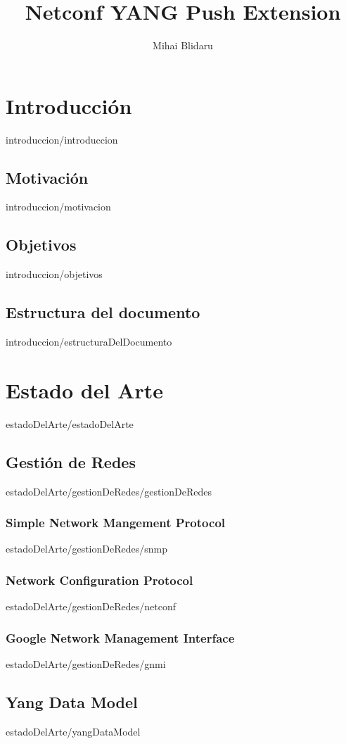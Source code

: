 \documentclass[epsbased, copyright, final, overleaf, printable, extendedindex, firstnumbered, tfg]{tfgtfmthesisuam}
\title{Netconf YANG Push Extension}
\author{Mihai Blidaru}
\begin{document}


\chapter{Introducción\label{CAP:INTRODUCION}}{introduccion/introduccion}
  \section{Motivación\label{SEC:MOTIVACION}}{introduccion/motivacion}
  \section{Objetivos\label{SEC:OBJETIVOS}}{introduccion/objetivos}
  \section{Estructura del documento\label{SEC:ESTRUCTURA_DEL_DOCUMENTO}}{introduccion/estructuraDelDocumento}

\chapter{Estado del Arte\label{CAP:ESTADO_DEL_ARTE}}{estadoDelArte/estadoDelArte}
  \section{Gestión de Redes\label{SEC:GESTION_DE_REDES}}{estadoDelArte/gestionDeRedes/gestionDeRedes}
    \subsection{Simple Network Mangement Protocol\label{SUBSEC:SNMP}}{estadoDelArte/gestionDeRedes/snmp}
    \subsection{Network Configuration Protocol\label{SUBSEC:NETCONF}}{estadoDelArte/gestionDeRedes/netconf}
    \subsection{Google Network Management Interface\label{SUBSEC:GNMI}}{estadoDelArte/gestionDeRedes/gnmi}
  \section{Yang Data Model\label{SEC:YANG_DATA_MODEL}}{estadoDelArte/yangDataModel}
\end{document}
